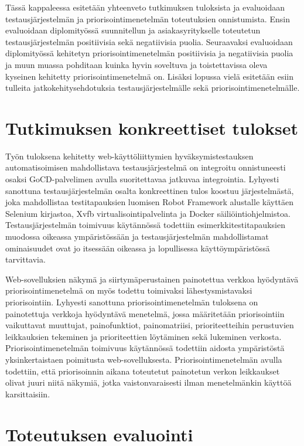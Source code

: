 Tässä kappaleessa esitetään yhteenveto tutkimuksen tuloksista ja evaluoidaan testausjärjestelmän ja priorisointimenetelmän toteutuksien onnistumista.
Ensin evaluoidaan diplomityössä suunnitellun ja asiakasyritykselle toteutetun testausjärjestelmän positiivisia sekä negatiivisia puolia.
Seuraavaksi evaluoidaan diplomityössä kehitetyn priorisointimenetelmän positiivisia ja negatiivisia puolia ja muun muassa pohditaan kuinka hyvin soveltuva ja toistettavissa oleva kyseinen kehitetty priorisointimenetelmä on.
Lisäksi lopussa vielä esitetään esiin tulleita jatkokehitysehdotuksia testausjärjestelmälle sekä priorisointimenetelmälle.

\section{Tutkimuksen konkreettiset tulokset} \label{ch:12_tutkimuksen_konkreettiset_tulokset}

  Työn tuloksena kehitetty  web-käyttöliittymien hyväksymistestauksen automatisoimisen mahdollistava testausjärjestelmä on integroitu onnistuneesti osaksi GoCD-palvelimen avulla suoritettavaa jatkuvaa integrointia.
  Lyhyesti sanottuna testausjärjestelmän osalta konkreettinen tulos koostuu järjestelmästä, joka mahdollistaa testitapauksien luomisen Robot Framework alustalle käyttäen Selenium kirjastoa, Xvfb virtualisointipalvelinta ja Docker säiliöintiohjelmistoa.
  Testausjärjestelmän toimivuus käytännössä todettiin esimerkkitestitapauksien muodossa oikeassa ympäristössään ja testausjärjestelmän mahdollistamat ominaisuudet ovat jo itsessään oikeassa ja lopullisessa käyttöympäristössä tarvittavia.

  Web-sovelluksien näkymä ja siirtymäperustainen painotettua verkkoa hyödyntävä priorisointimenetelmä on myös todettu toimivaksi lähestysmistavaksi priorisointiin.
  Lyhyesti sanottuna priorisointimenetelmän tuloksena on painotettuja verkkoja hyödyntävä menetelmä, jossa määritetään priorisointiin vaikuttavat muuttujat, painofunktiot, painomatriisi, prioriteetteihin perustuvien leikkauksien tekeminen ja prioriteettien löytäminen sekä lukeminen verkosta.
  Priorisointimenetelmän toimivuus käytännössä todettiin aidosta ympäristöstä yksinkertaistaen poimitusta web-sovelluksesta.
  Priorisointimenetelmän avulla todettiin, että priorisoinnin aikana toteutetut painotetun verkon leikkaukset olivat juuri niitä näkymiä, jotka vaistonvaraisesti ilman menetelmänkin käyttöä karsittaisiin.

\section{Toteutuksen evaluointi} \label{ch:12_toteutuksen_evaluointi}

